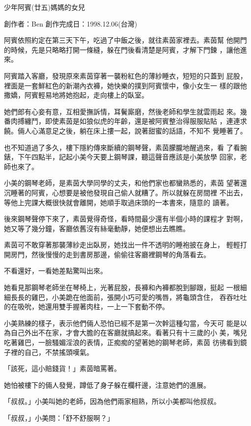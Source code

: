 



少年阿賓(廿五)媽媽的女兒

創作者：Ben
創作完成日：1998.12.06(台灣)


阿賓依照約定在第三天下午，吃過了中飯之後，就往素茵家裡去。素茵幫
他開門的時候，先是只略略打開一條縫，躲在門後看清楚是阿賓，才解下門鍊
，讓他進來。

阿賓踏入客廳，發現原來素茵穿著一襲粉紅色的薄紗睡衣，短短的只蓋到
屁股，裡面是一套鮮紅色的新潮內衣褲，她快樂的撲到阿賓懷中，像小女生一
樣的跟他撒嬌，阿賓輕易地將她抱起，走向樓上的臥室。

她們郎有心妾有意，互相愛撫訴情，耳鬢廝磨，然後老師和學生就雲雨起
來。幾番肉搏纏鬥，即使素茵是如狼似虎的年齡，還是被阿賓整治得服服貼貼
，連連求饒。倆人心滿意足之後，躺在床上摟一起，說著甜蜜的話語，不知不
覺睡著了。

也不知道過了多久，樓下隱約傳來斷續的鋼琴聲，素茵朦朧地醒過來，看
了看腕錶，下午四點半，記起小美今天要上鋼琴課，聽這聲音應該是小美放學
回家，老師也來了。

小美的鋼琴老師，是素茵大學同學的丈夫，和他們家也都蠻熟悉的，素茵
望著還沉睡著的阿賓，心想要是被他發現自己偷人就糟了。所以就躲在房間裡
不出去，等他上完課大概很快就會離開，她順手取過床頭的一本書來，隨意的
讀著。

後來鋼琴聲停下來了，素茵覺得奇怪，看時間最少還有半個小時的課程才
對啊，她又等了幾分鐘，客廳依舊沒有絲毫動靜，她便想出去瞧瞧。

素茵可不敢穿著那襲薄紗走出臥房，她找出一件不透明的睡袍披在身上，
輕輕打開房門，然後慢慢的走到書房那邊，偷偷往客廳裡鋼琴的角落看去。

不看還好，一看她差點驚叫出來。

她看見那鋼琴老師坐在琴椅上，光著屁股，長褲和內褲都脫到腳跟，挺起
一根細細長長的雞巴，小美跪在他面前，張開小巧可愛的嘴唇，將龜頭含住，
吞吞吐吐的在吸吮，她還用雙手握著肉柱，一上一下套動不停。

小美熟練的樣子，表示他們倆人恐怕已經不是第一次幹這種勾當，今天可
能是以為自己外出不在家，才會大膽的在客廳就搞起來。看著只有十三歲的小
美，嘴兒吃著雞巴，一臉騷媚淫浪的表情，正痴痴的望著她的鋼琴老師，素茵
彷彿看到鏡子裡的自己，不禁搖頭嘆氣。

「該死，這小賠錢貨！」素茵暗罵著。

她怕被樓下的倆人發覺，蹲低了身子躲在欄杆邊，注意她們的進展。

「叔叔。」小美叫她的老師，因為他們兩家相熟，所以小美都叫他叔叔。

「叔叔，」小美問：「舒不舒服啊？」

